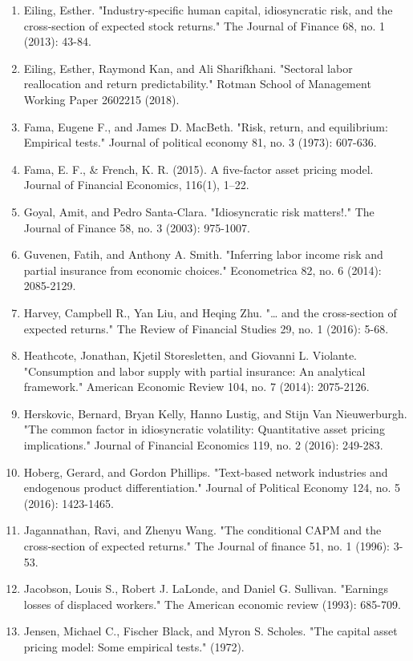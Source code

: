 \documentclass[12pt]{article}
\begin{document}
\begin{enumerate}
    \item{Eiling, Esther. "Industry‐specific human capital, idiosyncratic risk, and the cross‐section of expected stock returns." The Journal of Finance 68, no. 1 (2013): 43-84.}
    \item{Eiling, Esther, Raymond Kan, and Ali Sharifkhani. "Sectoral labor reallocation and return predictability." Rotman School of Management Working Paper 2602215 (2018).}
    \item {Fama, Eugene F., and James D. MacBeth. "Risk, return, and equilibrium: Empirical tests." Journal of political economy 81, no. 3 (1973): 607-636.}
    \item {Fama, E. F., \& French, K. R. (2015). A five-factor asset pricing model. Journal of Financial Economics, 116(1), 1–22. }
    \item{Goyal, Amit, and Pedro Santa‐Clara. "Idiosyncratic risk matters!." The Journal of Finance 58, no. 3 (2003): 975-1007.}
    \item{Guvenen, Fatih, and Anthony A. Smith. "Inferring labor income risk and partial insurance from economic choices." Econometrica 82, no. 6 (2014): 2085-2129.}
    \item {Harvey, Campbell R., Yan Liu, and Heqing Zhu. "… and the cross-section of expected returns." The Review of Financial Studies 29, no. 1 (2016): 5-68.}
    \item{Heathcote, Jonathan, Kjetil Storesletten, and Giovanni L. Violante. "Consumption and labor supply with partial insurance: An analytical framework." American Economic Review 104, no. 7 (2014): 2075-2126.}
    \item{Herskovic, Bernard, Bryan Kelly, Hanno Lustig, and Stijn Van Nieuwerburgh. "The common factor in idiosyncratic volatility: Quantitative asset pricing implications." Journal of Financial Economics 119, no. 2 (2016): 249-283.}
    \item{Hoberg, Gerard, and Gordon Phillips. "Text-based network industries and endogenous product differentiation." Journal of Political Economy 124, no. 5 (2016): 1423-1465.}
    \item{Jagannathan, Ravi, and Zhenyu Wang. "The conditional CAPM and the cross‐section of expected returns." The Journal of finance 51, no. 1 (1996): 3-53.}
    \item{Jacobson, Louis S., Robert J. LaLonde, and Daniel G. Sullivan. "Earnings losses of displaced workers." The American economic review (1993): 685-709.}
    \item {Jensen, Michael C., Fischer Black, and Myron S. Scholes. "The capital asset pricing model: Some empirical tests." (1972).}

\end{enumerate}
\end{document}
